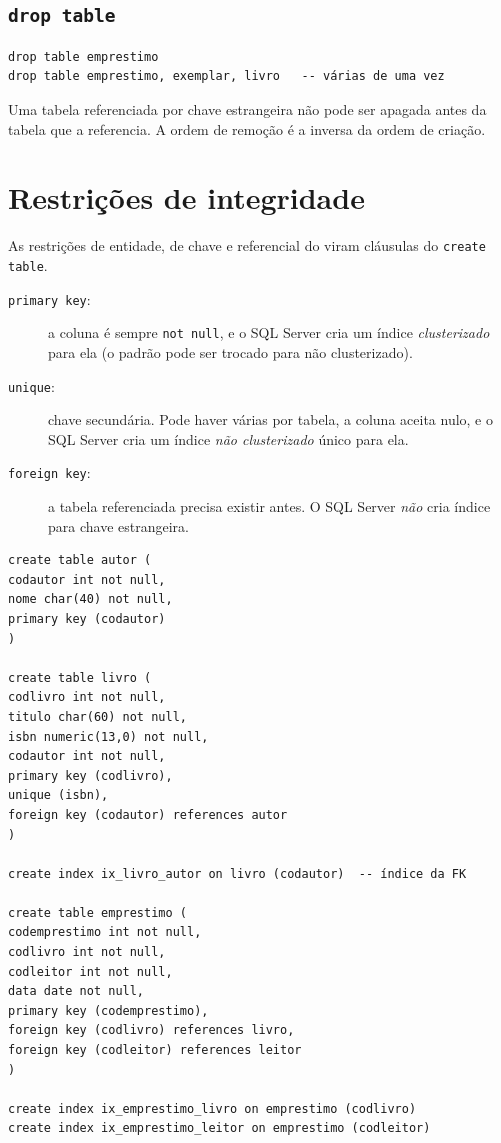 \subsection{\texttt{drop table}}

\begin{lstlisting}
drop table emprestimo
drop table emprestimo, exemplar, livro   -- várias de uma vez
\end{lstlisting}

Uma tabela referenciada por chave estrangeira não pode ser apagada antes
da tabela que a referencia. A ordem de remoção é a inversa da ordem de
criação.

\section{Restrições de integridade}

As restrições de entidade, de chave e referencial do
 viram cláusulas do \texttt{create table}.

\begin{description}
	\item[\texttt{primary key}:] a
	coluna é sempre \texttt{not null}, e o SQL Server cria um índice
	\emph{clusterizado} para ela (o padrão pode ser trocado para não
	clusterizado).
	\item[\texttt{unique}:] chave secundária. Pode haver várias por tabela,
	a coluna aceita nulo, e o SQL Server cria um índice \emph{não
	clusterizado} único para ela.
	\item[\texttt{foreign key}:] a tabela referenciada precisa existir
	antes. O SQL Server \emph{não} cria índice para chave estrangeira.
\end{description}

\begin{lstlisting}[caption={Esquema de biblioteca com as três restrições.}]
create table autor (
codautor int not null,
nome char(40) not null,
primary key (codautor)
)

create table livro (
codlivro int not null,
titulo char(60) not null,
isbn numeric(13,0) not null,
codautor int not null,
primary key (codlivro),
unique (isbn),
foreign key (codautor) references autor
)

create index ix_livro_autor on livro (codautor)  -- índice da FK

create table emprestimo (
codemprestimo int not null,
codlivro int not null,
codleitor int not null,
data date not null,
primary key (codemprestimo),
foreign key (codlivro) references livro,
foreign key (codleitor) references leitor
)

create index ix_emprestimo_livro on emprestimo (codlivro)
create index ix_emprestimo_leitor on emprestimo (codleitor)
\end{lstlisting}

